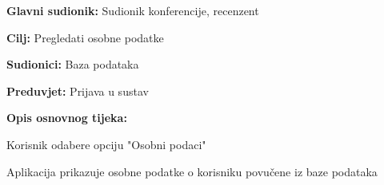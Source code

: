 					\noindent {}
					\begin{packed_item}
	
						\item \textbf{Glavni sudionik: } Sudionik konferencije, recenzent
						\item  \textbf{Cilj:} Pregledati osobne podatke
						\item  \textbf{Sudionici:} Baza podataka
						\item  \textbf{Preduvjet:} Prijava u sustav
						\item  \textbf{Opis osnovnog tijeka:}
						
						\item[] \begin{packed_enum}
	
							\item Korisnik odabere opciju "Osobni podaci"
							\item Aplikacija prikazuje osobne podatke o korisniku povučene iz baze podataka
					
						\end{packed_enum}
			
					\end{packed_item}

